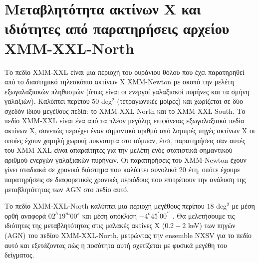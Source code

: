 \chapter{ Μεταβλητότητα ακτίνων Χ και ιδιότητες από παρατηρήσεις αρχείου \textlatin{XMM-XXL-North} }
Το πεδίο \textlatin{XMM-XXL} είναι μια περιοχή του ουράνιου θόλου που έχει παρατηρηθεί από το διαστημικό τηλεσκόπιο ακτίνων Χ \textlatin{XMM-Newton} με σκοπό την μελέτη εξωγαλαξιακών πληθυσμών (όπως είναι οι ενεργοί γαλαξιακοί πυρήνες και τα σμήνη γαλαξιών)\cite{2016A&A...592A...1P}. Καλύπτει περίπου $50 $ \textlatin{deg}$^2$ (τετραγωνικές μοίρες) και χωρίζεται σε δύο σχεδόν ίδιου μεγέθους πεδία: το \textlatin{XMM-XXL-North} και το \textlatin{XMM-XXL-South}\cite{2016A&A...592A...1P}. Το πεδίο \textlatin{XMM-XXL} είναι ένα από τα πλέον μεγάλης επιφάνειας εξωγαλαξιακά πεδία ακτίνων Χ, συνεπώς περιέχει έναν σημαντικό αριθμό από λαμπρές πηγές ακτίνων Χ οι οποίες έχουν χαμηλή χωρική πυκνοτητα στο σύμπαν, έτσι, παρατηρήσεις σαν αυτές του \textlatin{XMM-XXL} είναι απαραίτητες για την μελέτη ενός στατιστικά σημαντικού αριθμού ενεργών γαλαξιακών πυρήνων. Οι παρατηρήσεις του \textlatin{XMM-Newton} έχουν γίνει σταδιακά σε χρονικό διάστημα που καλύπτει συνολικά 20 έτη, οπότε έχουμε παρατηρήσεις σε διαφορετικές χρονικές περιόδους που επιτρέπουν την ανάλυση της μεταβλητότητας των \textlatin{AGN} στο πεδίο αυτό.

Το πεδίο \textlatin{XMM-XXL-North} καλύπτει μια περιοχή μεγέθους περίπου $18 $ \textlatin{deg}$^2$ με μέση ορθή αναφορά $02^h 19^m 00^s$ και μέση απόκλιση $ -4^{o}45^{\prime}00^{\prime \prime}$ \cite{2016MNRAS.459.1602L} \cite{2016MNRAS.457..110M}.
Θα μελετήσουμε τις ιδιότητες της μεταβλητότητας στις μαλακές ακτίνες Χ ($0.2-2$ \textlatin{keV}) των πηγών (\textlatin{AGN}) του πεδίου \textlatin{XMM-XXL-North}, μετρώντας την \textlatin{ensemble NXSV} για το πεδίο αυτό και εξετάζοντας πώς η ποσότητα αυτή σχετίζεται με φυσικά μεγέθη του δείγματος. 


